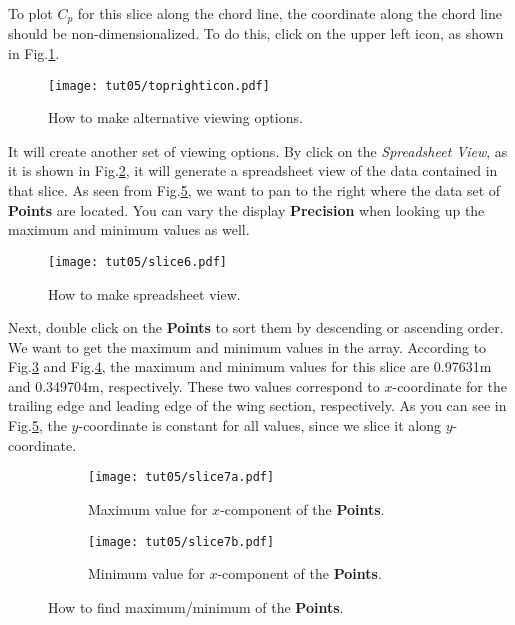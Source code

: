 To plot $C_p$ for this slice along the chord line, the coordinate along the chord line should be non-dimensionalized. To do this, click on the upper left icon, as shown in Fig.\ref{fig5:toprighticon}.
\begin{figure}[htbp]
    \centering
    \texttt{[image: tut05/toprighticon.pdf]}
    \caption{How to make alternative viewing options.}
    \label{fig5:toprighticon}
\end{figure}
It will create another set of viewing options. By click on the \textit{Spreadsheet View}, as it is shown in Fig.\ref{fig5:slice6}, it will generate a spreadsheet view of the data contained in that slice. As seen from Fig.\ref{fig5:slice7}, we want to pan to the right where the data set of \textbf{Points} are located. You can vary the display \textbf{Precision} when looking up the maximum and minimum values as well.
\begin{figure}[htbp]
    \centering
    \texttt{[image: tut05/slice6.pdf]}
    \caption{How to make spreadsheet view.}
    \label{fig5:slice6}
\end{figure}
Next, double click on the \textbf{Points} to sort them by descending or ascending order. We want to get the maximum and minimum values in the array. According to Fig.\ref{fig5:slice7 a} and Fig.\ref{fig5:slice7 b}, the maximum and minimum values for this slice are 0.97631m and 0.349704m, respectively. These two values correspond to $x$-coordinate for the trailing edge and leading edge of the wing section, respectively. As you can see in Fig.\ref{fig5:slice7}, the $y$-coordinate is constant for all values, since we slice it along $y$-coordinate.
\begin{figure}[htbp]
    \centering
     \begin{subfigure}[b]{.85\textwidth}
         \centering
         \texttt{[image: tut05/slice7a.pdf]}
         \caption{Maximum value for $x$-component of the \textbf{Points}.}
         \label{fig5:slice7 a}
     \end{subfigure}
     \hfill
     \begin{subfigure}[b]{.85\textwidth}
         \centering
         \texttt{[image: tut05/slice7b.pdf]}
         \caption{Minimum value for $x$-component of the \textbf{Points}.}
         \label{fig5:slice7 b}
     \end{subfigure}     
    \caption{How to find maximum/minimum of the \textbf{Points}.}
    \label{fig5:slice7}
\end{figure}
